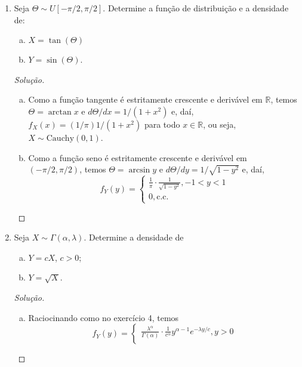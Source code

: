 \documentclass[../Notas.tex]{subfiles}
\begin{document}
\begin{enumerate}
\begin{proof}[Solução]
\[        \]
        logo $\lambda e^{-\lambda y} = f(\sqrt{y})/\sqrt{y}$, ou seja, $f(|x|) 
        = \lambda|x|e^{-\lambda x^2} = f(x), x\in\mathbb{R}$.
    \end{proof}
    \item Seja $\Theta \sim U[-\pi/2 , \pi/2]$. Determine a função de distribuição e a densidade de:
    \begin{enumerate}[a)]
    \item $X = \tan(\Theta)$
    \item $Y = \sin(\Theta)$.
    \end{enumerate}
    \begin{proof}[Solução]
        \begin{enumerate}[a)]
            \item Como a função tangente é estritamente crescente e derivável em $\mathbb{R}$, temos
            $\Theta = \arctan x$ e $d\Theta/dx = 1/(1+x^2)$ e, daí, $f_X(x) = (1/\pi)1/(1+x^2)$ para
            todo $x\in\mathbb{R}$, ou seja, $X\sim\text{Cauchy}(0,1)$.
            \item Como a função seno é estritamente crescente e derivável em $(-\pi/2, \pi/2)$, temos
            $\Theta = \arcsin y$ e $d\Theta/dy = 1/\sqrt{1-y^2}$ e, daí,
            \[
            f_Y(y) = \begin{cases}
            \frac{1}{\pi}\cdot\frac{1}{\sqrt{1-y^2}}, -1<y<1 \\
            0, \text{c.c.}
            \end{cases}
            \]
        \end{enumerate}
    \end{proof}
    \item Seja $X\sim\Gamma(\alpha,\lambda)$. Determine a densidade de
    \begin{enumerate}[a)]
    \item $Y = cX$, $c > 0$;
    \item $Y = \sqrt{X}$.
    \end{enumerate}
    \begin{proof}[Solução]
        \begin{enumerate}[a)]
            \item Raciocinando como no exercício 4, temos
            \[
            f_Y(y) = \begin{cases}
            \frac{\lambda^{\alpha}}{\Gamma(\alpha)}
            \cdot\frac{1}{c^{\alpha}}y^{\alpha-1}e^{-\lambda y/c}, y > 0 \\

\end{cases}\]
\end{enumerate}
\end{proof}
\end{enumerate}
\end{document}
